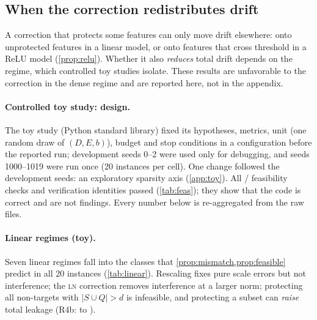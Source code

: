 \documentclass{article}
\theoremstyle{plain}
\theoremstyle{definition}
\theoremstyle{remark}
\newcommand{\LN}{\textsc{ln}}
\begin{document}
\begin{table}[t]
  \caption{Target-matched fidelity with its full denominator (REAL-01R pilot, dose $q_{99}$,
  float64; medians over test documents). ``Matched'': test points whose target error is at
  most $10^{-6}$, out of all test points; drift for a row with fewer matched points is over
  its feasible or deployed rows only, and the inactive rescaled row misses the target
  (error \RgRescInactErr) and is not comparable. Drift is relative to $\alpha$; KL is over
  the 16 positions after the edit (2 documents per feature and target type). Mean-only rows
  exist only under the raw readout and are omitted. Intervals: \cref{tab:pilot-ci}; status
  counts: \cref{tab:denominators}.}
  \label{tab:pilot}
  \centering
  \small
  
\end{table}

\subsection{When the correction redistributes drift}
\label{sec:redistribution}
A correction that protects some features can only move drift elsewhere: onto unprotected
features in a linear model, or onto features that cross threshold in a ReLU model
(\cref{prop:relu}). Whether it also \emph{reduces} total drift depends on the regime, which
controlled toy studies isolate. These results are unfavorable to the correction in the
dense regime and are reported here, not in the appendix.

\paragraph{Controlled toy study: design.}
The toy study (Python standard library) fixed its hypotheses, metrics, unit (one random draw
of $(D, E, b)$), budget and stop conditions in a configuration before the reported run;
development seeds 0--2 were used only for debugging, and seeds 1000--1019 were run once (20
instances per cell). One change followed the development seeds: an exploratory sparsity
axis (\cref{app:toy}). All \FeasTotalPass/\FeasTotal{} feasibility checks and verification
identities passed (\cref{tab:feas}); they show that the code is correct and are not findings.
Every number below is re-aggregated from the raw files.

\paragraph{Linear regimes (toy).}
Seven linear regimes fall into the classes that \cref{prop:mismatch,prop:feasible} predict in
all 20 instances (\cref{tab:linear}). Rescaling fixes pure scale errors but not
interference; the \LN{} correction removes interference at a larger norm; protecting all
non-targets with $|S\cup Q|>d$ is infeasible, and protecting a subset can \emph{raise}
total leakage (R4b: \RfourbDecLeak{} to \RfourbLnLeak).
\end{document}
